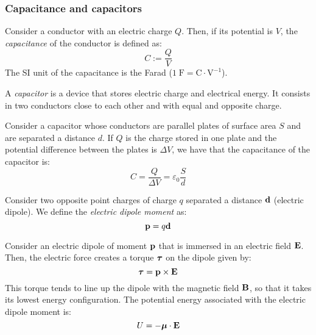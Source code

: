 \documentclass[../../../main.tex]{subfiles}
\begin{document}
\begin{multicols}{2}
  \subsubsection{Capacitance and capacitors}
  \begin{definition}[Capacitance]
    Consider a conductor with an electric charge $Q$. Then, if its potential is $V$, the \textit{capacitance} of the conductor is defined as: $$C:=\frac{Q}{V}$$
    The SI unit of the capacitance is the Farad ($1\;\text{F}=\text{C}\cdot\text{V}^{-1}$).
  \end{definition}
  \begin{definition}[Capacitor]
    A \textit{capacitor} is a device that stores electric charge and electrical energy. It consists in two conductors close to each other and with equal and opposite charge.
  \end{definition}
  \begin{prop}
    Consider a capacitor whose conductors are parallel plates of surface area $S$ and are separated a distance $d$. If $Q$ is the charge stored in one plate and the  potential difference between the plates is $\Delta V$, we have that the capacitance of the capacitor is: $$C=\frac{Q}{\Delta V}=\varepsilon_0\frac{S}{d}$$
  \end{prop}
  \begin{definition}
    Consider two opposite point charges of charge $q$ separated a distance $\boldsymbol{\mathrm{d}}$ (electric dipole). We define the \textit{electric dipole moment} as: $$\boldsymbol{\mathrm{p}}=q\boldsymbol{\mathrm{d}}$$
  \end{definition}
  \begin{prop}
    Consider an electric dipole of moment $\boldsymbol{\mathrm{p}}$ that is immersed in an electric field $\boldsymbol{\mathrm{E}}$. Then, the electric force creates a torque $\vb*{\tau}$ on the dipole given by: $$\vb*{\tau}=\boldsymbol{\mathrm{p}}\times\boldsymbol{\mathrm{E}}$$ This torque tends to line up the dipole with the magnetic field $\boldsymbol{\mathrm{B}}$, so that it takes its lowest energy configuration. The potential energy associated with the electric dipole moment is: $$U=-\vb*{\mu}\cdot\boldsymbol{\mathrm{E}}$$
  \end{prop}
  \begin{center}
    \begin{minipage}{\linewidth}
      \centering
      
    \end{minipage}
  \end{center}

\end{multicols}
\end{document}
